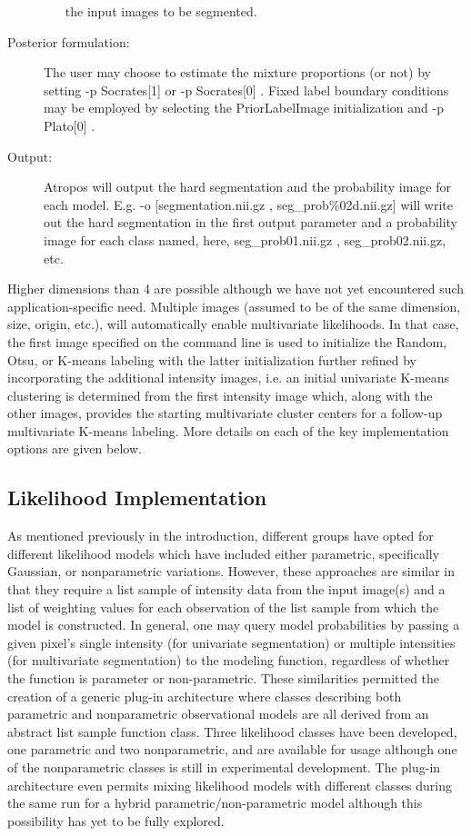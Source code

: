 \documentclass[11pt,english]{article}
\begin{document}
\begin{description}
\begin{itemize}
  the input images to be segmented.  
\end{itemize}
\item[Posterior formulation:]  The user may choose to estimate the
  mixture proportions (or not) by setting  {\ttfamily -p Socrates[1]}
  or {\ttfamily -p Socrates[0] }.  Fixed label boundary conditions may be employed by
  selecting the PriorLabelImage initialization and   {\ttfamily -p Plato[0] }.
\item[Output:] Atropos will output the hard segmentation and the
  probability image for each model.  E.g.  {\ttfamily -o
    [segmentation.nii.gz , seg\_prob\%02d.nii.gz] } will write
  out the hard segmentation in the first output parameter and a
  probability image for each class named, here, seg\_prob01.nii.gz ,
  seg\_prob02.nii.gz, etc. 
\end{description}
Higher dimensions than 4 are possible although we have not yet encountered such 
application-specific need.  Multiple images (assumed to be of the same
dimension, size, origin, etc.), will automatically enable multivariate
likelihoods.  In that case, the first image specified on the 
command line is used to initialize the Random, Otsu, or K-means labeling with the latter initialization further
refined by incorporating the additional intensity images, i.e. an initial univariate K-means clustering is determined 
from the first intensity image which, along with the other images, provides the starting multivariate cluster centers for a 
follow-up multivariate K-means labeling.    More details on each of
the key implementation options are given below.  

\subsection{Likelihood Implementation}
As mentioned previously in the introduction, different groups have
opted for different likelihood models which have included either
parametric, specifically Gaussian, or nonparametric variations.
However, these approaches are similar in that they require a list
sample of intensity data from the input image(s) and a list of
weighting values for each observation of the list sample from which
the model is constructed.  In general, one may query model
probabilities by passing a given pixel's single intensity (for
univariate segmentation) or multiple intensities (for multivariate
segmentation) to the modeling function, regardless of whether the
function is parameter or non-parametric.  These similarities permitted
the creation of a generic plug-in architecture where classes
describing both parametric and nonparametric observational models are
all derived from an abstract list sample function class.  Three
likelihood classes have been developed, one parametric and two
nonparametric, and are available for usage although one of the
nonparametric classes is still in experimental development.  The
plug-in architecture even permits mixing likelihood models with
different classes during the same run for a hybrid
parametric/non-parametric model although this possibility has yet
to be fully explored.
\end{document}
